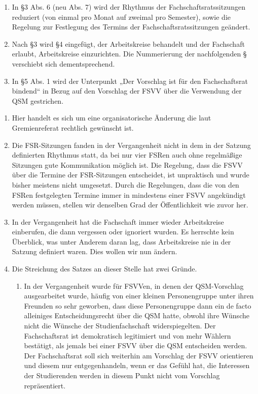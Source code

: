{\begin{enumerate}
            weniger Kandidierenden als Plätze, für oder gegen jede einzelne Person gestimmt
            werden kann.
            Aus einem werden hier zwei Absätze, wodurch sich die darauffolgende Nummerierung
            verschiebt.
            \item In §3 Abs. 6 (neu Abs. 7) wird der Rhythmus der Fachschaftsratssitzungen
            reduziert (von einmal pro Monat auf zweimal pro Semester), sowie die Regelung
            zur Festlegung des Termins der Fachschaftsratssitzungen geändert.
            \item Nach §3 wird §4 eingefügt, der Arbeitskreise behandelt und der Fachschaft
            erlaubt, Arbeitskreise einzurichten. Die Nummerierung der nachfolgenden §
            verschiebt sich dementsprechend.
            \item In §5 Abs. 1 wird der Unterpunkt „Der Vorschlag ist für den Fachschaftsrat
            bindend“ in Bezug auf den Vorschlag der FSVV über die Verwendung der QSM
            gestrichen.
        \end{enumerate}
    }{
        \begin{enumerate}
            \item Hier handelt es sich um eine organisatorische Änderung die laut Gremienreferat rechtlich gewünscht ist.
            \item Die FSR-Sitzungen fanden in der Vergangenheit nicht in dem in der Satzung definierten Rhythmus statt, da bei nur vier FSRen auch ohne regelmäßige Sitzungen gute Kommunikation möglich ist. Die Regelung, dass die FSVV über die Termine der FSR-Sitzungen entscheidet, ist unpraktisch und wurde bisher meistens nicht umgesetzt. Durch die Regelungen, dass die von den FSRen festgelegten Termine immer in mindestens einer FSVV angekündigt werden müssen, stellen wir denselben Grad der Öffentlichkeit wie zuvor her.
            \item In der Vergangenheit hat die Fachschaft immer wieder Arbeitskreise einberufen, die dann vergessen oder ignoriert wurden. Es herrschte kein Überblick, was unter Anderem daran lag, dass Arbeitskreise nie in der Satzung definiert waren. Dies wollen wir nun ändern.
            \item Die Streichung des Satzes an dieser Stelle hat zwei Gründe.
                \begin{enumerate}
                    \item In der Vergangenheit wurde für FSVVen, in denen der QSM-Vorschlag ausgearbeitet wurde, häufig von einer kleinen Personengruppe unter ihren Freunden so sehr geworben, dass diese Personengruppe dann ein de facto alleiniges Entscheidungsrecht über die QSM hatte, obwohl ihre Wünsche nicht die Wünsche der Studienfachschaft widerspiegelten. Der Fachschaftsrat ist demokratisch legitimiert und von mehr Wählern bestätigt, als jemals bei einer FSVV über die QSM entscheiden werden. Der Fachschaftsrat soll sich weiterhin am Vorschlag der FSVV orientieren und diesem nur entgegenhandeln, wenn er das Gefühl hat, die Interessen der Studierenden werden in diesem Punkt nicht vom Vorschlag repräsentiert.

\end{enumerate}
\end{enumerate}}
